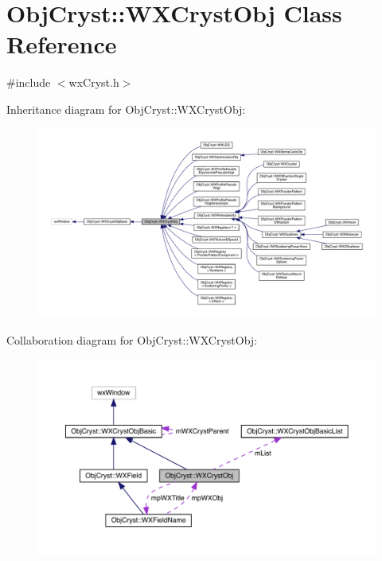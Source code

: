 \hypertarget{class_obj_cryst_1_1_w_x_cryst_obj}{}\section{Obj\+Cryst\+::W\+X\+Cryst\+Obj Class Reference}
\label{class_obj_cryst_1_1_w_x_cryst_obj}


{\ttfamily \#include $<$wx\+Cryst.\+h$>$}



Inheritance diagram for Obj\+Cryst\+::W\+X\+Cryst\+Obj\+:
\nopagebreak
\begin{figure}[H]
\begin{center}
\leavevmode
\includegraphics[width=350pt]{class_obj_cryst_1_1_w_x_cryst_obj__inherit__graph}
\end{center}
\end{figure}


Collaboration diagram for Obj\+Cryst\+::W\+X\+Cryst\+Obj\+:
\nopagebreak
\begin{figure}[H]
\begin{center}
\leavevmode
\includegraphics[width=350pt]{class_obj_cryst_1_1_w_x_cryst_obj__coll__graph}
\end{center}
\end{figure}
